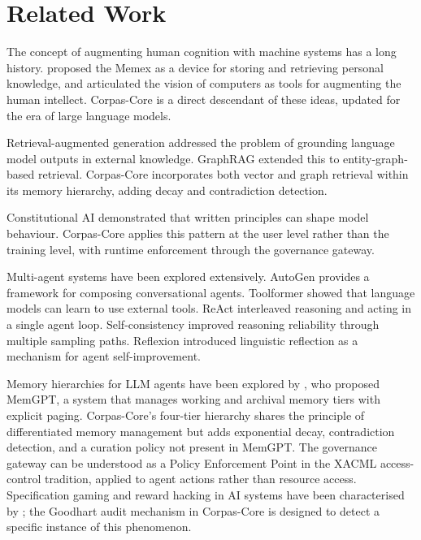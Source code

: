 \documentclass[11pt,a4paper]{article}
\begin{document}
\section{Related Work}

The concept of augmenting human cognition with machine systems has a long history. \citet{bush1945memex} proposed the Memex as a device for storing and retrieving personal knowledge, and \citet{engelbart1962augmenting} articulated the vision of computers as tools for augmenting the human intellect. Corpas-Core is a direct descendant of these ideas, updated for the era of large language models.

Retrieval-augmented generation \citep{lewis2020rag} addressed the problem of grounding language model outputs in external knowledge. GraphRAG \citep{edge2024graphrag} extended this to entity-graph-based retrieval. Corpas-Core incorporates both vector and graph retrieval within its memory hierarchy, adding decay and contradiction detection.

Constitutional AI \citep{bai2022constitutional} demonstrated that written principles can shape model behaviour. Corpas-Core applies this pattern at the user level rather than the training level, with runtime enforcement through the governance gateway.

Multi-agent systems have been explored extensively. AutoGen \citep{wu2023autogen} provides a framework for composing conversational agents. Toolformer \citep{schick2023toolformer} showed that language models can learn to use external tools. ReAct \citep{yao2023react} interleaved reasoning and acting in a single agent loop. Self-consistency \citep{wang2023selfconsistency} improved reasoning reliability through multiple sampling paths. Reflexion \citep{shinn2023reflexion} introduced linguistic reflection as a mechanism for agent self-improvement.

Memory hierarchies for LLM agents have been explored by \citet{packer2023memgpt}, who proposed MemGPT, a system that manages working and archival memory tiers with explicit paging. Corpas-Core's four-tier hierarchy shares the principle of differentiated memory management but adds exponential decay, contradiction detection, and a curation policy not present in MemGPT. The governance gateway can be understood as a Policy Enforcement Point in the XACML access-control tradition, applied to agent actions rather than resource access. Specification gaming and reward hacking in AI systems have been characterised by \citet{krakovna2020specification}; the Goodhart audit mechanism in Corpas-Core is designed to detect a specific instance of this phenomenon.
\end{document}
